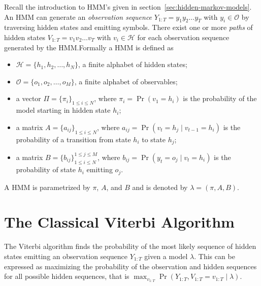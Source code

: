 Recall the introduction to HMM's given in
section~\ref{sec:hidden-markov-models}. An HMM can generate an \emph{observation
 sequence} $Y_{1:T} = y_1y_2\dots{}y_T$ with $y_i \in \mathcal{O}$ by
traversing hidden states and emitting symbols. There exist one or more
\emph{paths} of hidden states $V_{1:T} = v_1v_2\dots{}v_T$ with
$v_i \in \mathcal{H}$ for each observation sequence generated by the HMM.\@ Formally
a HMM is defined as
\begin{itemize}
\item $\mathcal{H} = \{h_1, h_2, \dots, h_N\}$, a finite alphabet of hidden
  states;
\item $\mathcal{O} = \{o_1, o_2, \dots, o_M\}$, a finite alphabet of observables;
\item a vector $\Pi = {\{\pi_i\}}_{1 \le i \le N}$, where $\pi_i = \Pr(v_1 =
  h_i)$ is the probability of the model starting in hidden state $h_i$;
\item a matrix $A = {\{a_{ij}\}}_{1 \le i \le N}$, where $a_{ij} = \Pr(v_t
  = h_j \mid v_{t - 1} = h_i)$ is the probability of a transition from state
  $h_i$ to state $h_j$;
\item a matrix $B = {\{b_{ij}\}}_{1 \le i \le N}^{1 \le j \le M}$, where
  $b_{ij} = \Pr(y_t = o_j \mid v_t = h_i)$ is the probability of state
  $h_i$ emitting $o_j$.
\end{itemize}
A HMM is parametrized by $\pi$, $A$, and $B$ and is denoted by $\lambda =
(\pi, A, B)$.

\section{The Classical Viterbi Algorithm}
\label{sec:class-viterbi-algor}

The Viterbi algorithm finds the probability of the most likely sequence of
hidden states emitting an observation sequence $Y_{1:T}$ given a model
$\lambda$. This can be expressed as maximizing the probability of the
observation and hidden sequences for all possible hidden sequences, that is
$\max_{v_{1:T}} \Pr(Y_{1:T}, V_{1:T} = v_{1:T} \mid \lambda)$.

